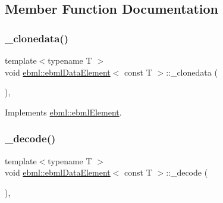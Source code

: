 \subsection{Member Function Documentation}
\mbox{\label{classebml_1_1ebmlDataElement_3_01const_01T_01_4_a46a152b21a6fc49a331e61f29c486ebe}} 
\subsubsection{\texorpdfstring{\+\_\+clonedata()}{\_clonedata()}}
{\footnotesize\ttfamily template$<$typename T $>$ \\
void \mbox{\hyperlink{classebml_1_1ebmlDataElement}{ebml\+::ebml\+Data\+Element}}$<$ const T $>$\+::\+\_\+clonedata (\begin{DoxyParamCaption}\item[{const \mbox{\hyperlink{classebml_1_1ebmlElement}{ebml\+Element}} $\ast$}]{ }\end{DoxyParamCaption})\hspace{0.3cm}{\ttfamily [protected]}, {\ttfamily [virtual]}}



Implements \mbox{\hyperlink{classebml_1_1ebmlElement_a3ebe3aa75b62971f385c01f27c807a02}{ebml\+::ebml\+Element}}.

\mbox{\label{classebml_1_1ebmlDataElement_3_01const_01T_01_4_a425794d8e3dd48e30dc1eb29e600de85}} 
\subsubsection{\texorpdfstring{\+\_\+decode()}{\_decode()}\hspace{0.1cm}{\footnotesize\ttfamily [1/2]}}
{\footnotesize\ttfamily template$<$typename T $>$ \\
void \mbox{\hyperlink{classebml_1_1ebmlDataElement}{ebml\+::ebml\+Data\+Element}}$<$ const T $>$\+::\+\_\+decode (\begin{DoxyParamCaption}\item[{const \mbox{\hyperlink{classebml_1_1parseString}{parse\+String}} \&}]{ }\end{DoxyParamCaption})\hspace{0.3cm}{\ttfamily [protected]}, {\ttfamily [virtual]}}



